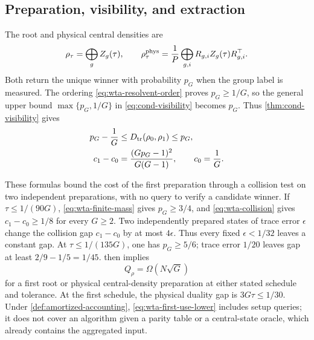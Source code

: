 \subsection{Preparation, visibility, and extraction}
\label{sec:wta-central-state}

The root and physical central densities are
\begin{equation}
 \rho_\tau=\bigoplus_g Z_g(\tau),
 \qquad
 \rho_\tau^{\rm phys}=\frac1P\bigoplus_{g,i}
 R_{g,i}Z_g(\tau)R_{g,i}^\top.
 \label{eq:wta-central-densities}
\end{equation}
Both return the unique winner with probability $p_G$ when the group label is
measured.  The ordering
\eqref{eq:wta-resolvent-order} proves $p_G\ge1/G$, so the general upper
bound $\max\{p_G,1/G\}$ in \eqref{eq:cond-visibility} becomes $p_G$.  Thus
\cref{thm:cond-visibility} gives
\begin{align}
 p_G-\frac1G&\le D_{\mathrm{tr}}(\rho_0,\rho_1)\le p_G,
 \label{eq:wta-visibility}\\
 c_1-c_0&=\frac{(Gp_G-1)^2}{G(G-1)},\qquad c_0=\frac1G.
 \label{eq:wta-collision}
\end{align}

These formulas bound the cost of the first preparation through a collision
test on two independent preparations, with no query to verify a candidate
winner.  If $\tau\le1/(90G)$, \eqref{eq:wta-finite-mass} gives $p_G\ge3/4$,
and \eqref{eq:wta-collision} gives $c_1-c_0\ge1/8$ for every $G\ge2$.
Two independently prepared states of trace error $\epsilon$ change the
collision gap $c_1-c_0$ by at most $4\epsilon$.  Thus every fixed $\epsilon<1/32$ leaves
a constant gap.  At $\tau\le1/(135G)$, one has $p_G\ge5/6$; trace error
$1/20$ leaves gap at least $2/9-1/5=1/45$.   then implies
\begin{equation}
 \boxed{Q_\rho=\Omega(N\sqrt G)}
 \label{eq:wta-first-use-lower}
\end{equation}
for a first root or physical central-density preparation at either stated
schedule and tolerance.  At the first schedule, the physical duality gap is $3G\tau\le1/30$.  Under
\cref{def:amortized-accounting}, \eqref{eq:wta-first-use-lower} includes
setup queries; it does not cover an algorithm given a parity table or a
central-state oracle, which already contains the aggregated input.

